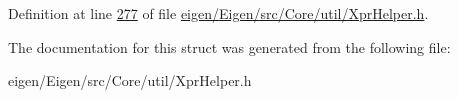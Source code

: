 Definition at line \hyperlink{eigen_2_eigen_2src_2_core_2util_2_xpr_helper_8h_source_l00277}{277} of file \hyperlink{eigen_2_eigen_2src_2_core_2util_2_xpr_helper_8h_source}{eigen/\+Eigen/src/\+Core/util/\+Xpr\+Helper.\+h}.



The documentation for this struct was generated from the following file\+:\begin{DoxyCompactItemize}
\item 
eigen/\+Eigen/src/\+Core/util/\+Xpr\+Helper.\+h\end{DoxyCompactItemize}
